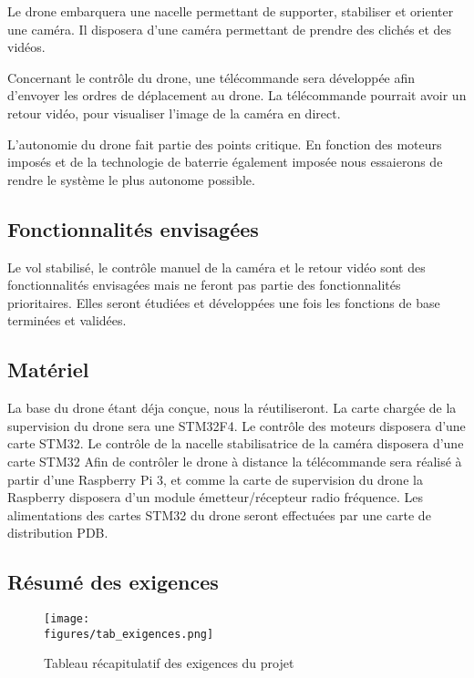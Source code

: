 \vspace{1cm}
Le drone embarquera une nacelle permettant de supporter, stabiliser et orienter une caméra. \newline
Il disposera d'une caméra permettant de prendre des clichés et des vidéos.

\vspace{1cm}
Concernant le contrôle du drone, une télécommande sera développée afin d'envoyer les ordres de déplacement au drone. La télécommande pourrait avoir un retour vidéo, pour visualiser l'image de la caméra en direct.

\vspace{1cm}
L'autonomie du drone fait partie des points critique. En fonction des moteurs imposés et de la technologie de baterrie également imposée nous essaierons de rendre le système le plus autonome possible.

\subsection{Fonctionnalités envisagées}

Le vol stabilisé, le contrôle manuel de la caméra et le retour vidéo sont des fonctionnalités envisagées mais ne feront pas partie des fonctionnalités prioritaires. Elles seront étudiées et développées une fois les fonctions de base terminées et validées.

\subsection{Matériel}

La base du drone étant déja conçue, nous la réutiliseront. \newline
La carte chargée de la supervision du drone sera une STM32F4. \newline
Le contrôle des moteurs disposera  d'une carte STM32.	\newline
Le contrôle de la nacelle stabilisatrice de la caméra disposera d'une carte STM32 \newline
Afin de contrôler le drone à distance la télécommande sera réalisé à partir d'une Raspberry Pi 3, et comme la carte de supervision du drone la Raspberry disposera d'un module émetteur/récepteur radio fréquence. \newline
Les alimentations des cartes STM32 du drone seront effectuées par une carte de distribution PDB.


\subsection{Résumé des exigences}
\begin{figure}[H]
	\centering
    \texttt{[image: \\figures/tab\_exigences.png]}
    \decoRule
    \caption[
    Tableau récapitulatif des exigences du projet]{
    Tableau récapitulatif des exigences du projet}
    \label{fig:Tableau récapitulatif des exigences du projet}
	\end{figure}


